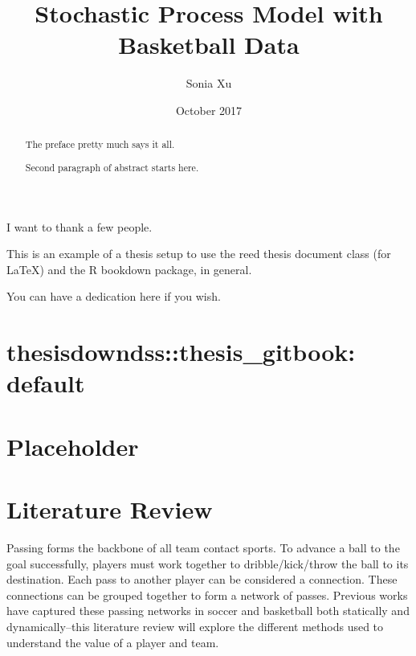 \documentclass[12pt,twoside]{dukestatscithesis}
\title{Stochastic Process Model with Basketball Data}
\author{Sonia Xu}
\date{October 2017}
\theoremstyle{definition}
\theoremstyle{definition}
\theoremstyle{definition}
\theoremstyle{remark}
\begin{document}
  \maketitle

\frontmatter %
\pagestyle{empty} %
  \begin{acknowledgements}
    I want to thank a few people.
  \end{acknowledgements}
  \begin{preface}
    This is an example of a thesis setup to use the reed thesis document
    class (for LaTeX) and the R bookdown package, in general.
  \end{preface}
  \hypersetup{linkcolor=black}
  \setcounter{tocdepth}{2}
  \tableofcontents

  \listoftables

  \listoffigures
  \begin{abstract}
    The preface pretty much says it all. \par
    
    Second paragraph of abstract starts here.
  \end{abstract}
  \begin{dedication}
    You can have a dedication here if you wish.
  \end{dedication}
\mainmatter %
\pagestyle{fancyplain} %

\chapter{thesisdowndss::thesis\_gitbook:
default}\label{thesisdowndssthesis_gitbook-default}

\chapter{Placeholder}\label{placeholder}

\chapter{Literature Review}\label{rmd-basics}

Passing forms the backbone of all team contact sports. To advance a ball
to the goal successfully, players must work together to
dribble/kick/throw the ball to its destination. Each pass to another
player can be considered a connection. These connections can be grouped
together to form a network of passes. Previous works have captured these
passing networks in soccer and basketball both statically and
dynamically--this literature review will explore the different methods
used to understand the value of a player and team.
\end{document}

